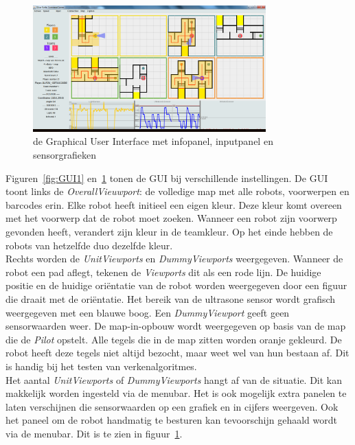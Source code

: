 \documentclass[tt3]{penoverslag}
\begin{document}
\begin{figure}[h] %
\centering
	\includegraphics[width=0.8\textwidth]{guiALL}
\caption{de Graphical User Interface met infopanel, inputpanel en sensorgrafieken}
\label{fig:GUI2}
\end{figure}

Figuren~\ref{fig:GUI1} en~\ref{fig:GUI2} tonen de GUI bij verschillende instellingen. De GUI toont links de \textit{OverallVieuwport}: de volledige map met alle robots, voorwerpen en barcodes erin. Elke robot heeft initieel een eigen kleur. Deze kleur komt overeen met het voorwerp dat de robot moet zoeken. Wanneer een robot zijn voorwerp gevonden heeft, verandert zijn kleur in de teamkleur. Op het einde hebben de robots van hetzelfde duo dezelfde kleur.\\

Rechts worden de \textit{UnitViewports} en \textit{DummyViewports} weergegeven. Wanneer de robot een pad aflegt, tekenen de \textit{Viewports} dit als een rode lijn. De huidige positie en de huidige ori\"entatie van de robot worden weergegeven door een figuur die draait met de ori\"entatie. Het bereik van de ultrasone sensor wordt grafisch weergegeven met een blauwe boog. Een \textit{DummyViewport} geeft geen sensorwaarden weer. De map-in-opbouw wordt weergegeven op basis van de map die de \textit{Pilot} opstelt. Alle tegels die in de map zitten worden oranje gekleurd. De robot heeft deze tegels niet altijd bezocht, maar weet wel van hun bestaan af. Dit is handig bij het testen van verkenalgoritmes.\\

Het aantal \textit{UnitViewports} of \textit{DummyViewports} hangt af van de situatie. Dit kan makkelijk worden ingesteld via de menubar. Het is ook mogelijk extra panelen te laten verschijnen die sensorwaarden op een grafiek en in cijfers weergeven. Ook het paneel om de robot handmatig te besturen kan tevoorschijn gehaald wordt via de menubar. Dit is te zien in figuur~\ref{fig:GUI2}.
\end{document}
